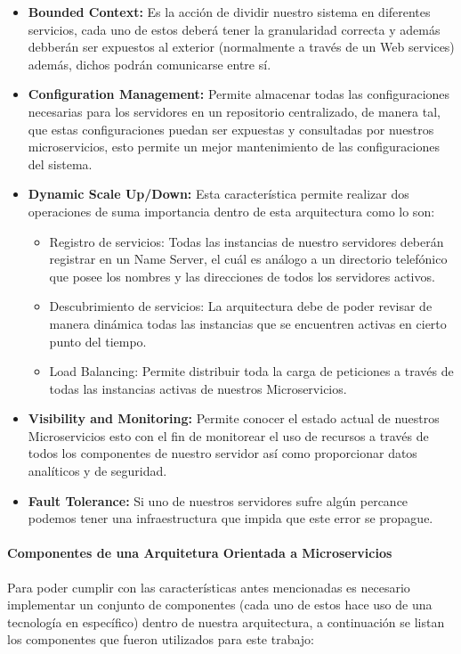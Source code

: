 \begin{itemize}
	\item \textbf{Bounded Context:} Es la acción de dividir nuestro sistema en diferentes servicios, cada uno de estos deberá tener la granularidad correcta y además debberán ser expuestos al exterior (normalmente a través de un Web services) además, dichos podrán comunicarse entre sí.
	\item \textbf{Configuration Management:} Permite almacenar todas las configuraciones necesarias para los servidores en un repositorio centralizado, de manera tal, que estas configuraciones puedan ser expuestas y consultadas por nuestros microservicios, esto permite un mejor mantenimiento de las configuraciones del sistema.
	\item \textbf{Dynamic Scale Up/Down:} Esta característica permite realizar dos operaciones de suma importancia dentro de esta arquitectura como lo son:
	\begin{itemize}
		\item Registro de servicios: Todas las instancias de nuestro servidores deberán registrar en un Name Server, el cuál es análogo a un directorio telefónico que posee los nombres y las direcciones de todos los servidores activos.
		\item Descubrimiento de servicios: La arquitectura debe de poder revisar de manera dinámica todas las instancias que se encuentren activas en cierto punto del tiempo.
		\item Load Balancing: Permite distribuir toda la carga de peticiones a través de todas las instancias activas de nuestros Microservicios.
	\end{itemize}
	\item \textbf{Visibility and Monitoring:} Permite conocer el estado actual de nuestros Microservicios esto con el fin de monitorear el uso de recursos a través de todos los componentes de nuestro servidor así como proporcionar datos analíticos y de seguridad.
	\item \textbf{Fault Tolerance:} Si uno de nuestros servidores sufre algún percance podemos tener una infraestructura que impida que este error se propague.
\end{itemize}


\paragraph{Componentes de una Arquitetura Orientada a Microservicios}
Para poder cumplir con las características antes mencionadas es necesario implementar un conjunto de componentes (cada uno de estos hace uso de una tecnología en específico) dentro de nuestra arquitectura, a continuación se listan los componentes que fueron utilizados para este trabajo:

